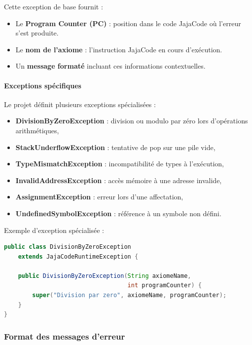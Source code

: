 Cette exception de base fournit :
\begin{itemize}
    \item Le \textbf{Program Counter (PC)} : position dans le code JajaCode où l'erreur s'est produite.
    \item Le \textbf{nom de l'axiome} : l'instruction JajaCode en cours d'exécution.
    \item Un \textbf{message formaté} incluant ces informations contextuelles.
\end{itemize}

\paragraph{Exceptions spécifiques}

Le projet définit plusieurs exceptions spécialisées :

\begin{itemize}
    \item \textbf{DivisionByZeroException} : division ou modulo par zéro lors d'opérations arithmétiques,
    \item \textbf{StackUnderflowException} : tentative de pop sur une pile vide,
    \item \textbf{TypeMismatchException} : incompatibilité de types à l'exécution,
    \item \textbf{InvalidAddressException} : accès mémoire à une adresse invalide,
    \item \textbf{AssignmentException} : erreur lors d'une affectation,
    \item \textbf{UndefinedSymbolException} : référence à un symbole non défini.
\end{itemize}

Exemple d'exception spécialisée :
\vspace{0.3cm}
\begin{lstlisting}[language=java, caption=DivisionByZeroException,label={lst:divisionbyzero-exception}]
public class DivisionByZeroException
    extends JajaCodeRuntimeException {

    public DivisionByZeroException(String axiomeName,
                                   int programCounter) {
        super("Division par zero", axiomeName, programCounter);
    }
}
\end{lstlisting}

\subsubsection{Format des messages d'erreur}\label{subsec:format-des-messages-d'erreur}

